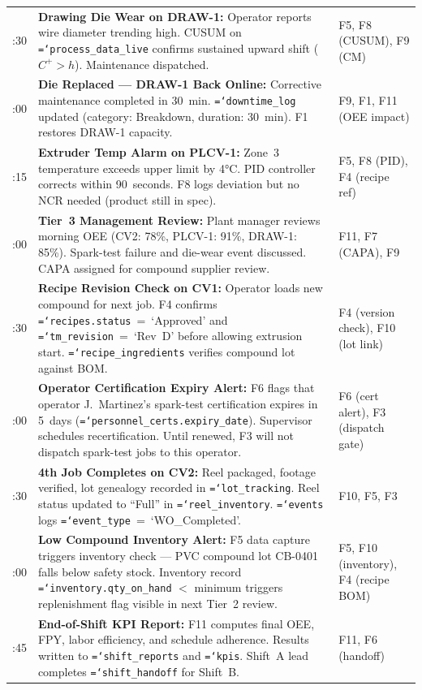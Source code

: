 \documentclass[11pt]{article}
\newcommand{\tfield}[1]{\texttt{\hyphenchar\font=`\-\relax #1}}
\begin{document}
\begin{longtable}{@{} l L{6.5cm} L{5.5cm} @{}}
:30 & \textbf{Drawing Die Wear on DRAW-1:} Operator reports wire diameter trending high.  CUSUM on \tfield{process\_data\_live} confirms sustained upward shift ($C^+ > h$).  Maintenance dispatched. & F5, F8 (CUSUM), F9 (CM) \\
:00 & \textbf{Die Replaced --- DRAW-1 Back Online:} Corrective maintenance completed in 30~min.  \tfield{downtime\_log} updated (category: Breakdown, duration: 30~min).  F1 restores DRAW-1 capacity. & F9, F1, F11 (OEE impact) \\
:15 & \textbf{Extruder Temp Alarm on PLCV-1:} Zone~3 temperature exceeds upper limit by 4°C.  PID controller corrects within 90~seconds.  F8 logs deviation but no NCR needed (product still in spec). & F5, F8 (PID), F4 (recipe ref) \\
:00 & \textbf{Tier~3 Management Review:} Plant manager reviews morning OEE (CV2: 78\%, PLCV-1: 91\%, DRAW-1: 85\%).  Spark-test failure and die-wear event discussed.  CAPA assigned for compound supplier review. & F11, F7 (CAPA), F9 \\
:30 & \textbf{Recipe Revision Check on CV1:} Operator loads new compound for next job.  F4 confirms \tfield{recipes.status}~=~`Approved' and \tfield{tm\_revision}~=~`Rev~D' before allowing extrusion start.  \tfield{recipe\_ingredients} verifies compound lot against BOM. & F4 (version check), F10 (lot link) \\
:00 & \textbf{Operator Certification Expiry Alert:} F6 flags that operator J.~Martinez's spark-test certification expires in 5~days (\tfield{personnel\_certs.expiry\_date}).  Supervisor schedules recertification.  Until renewed, F3 will not dispatch spark-test jobs to this operator. & F6 (cert alert), F3 (dispatch gate) \\
:30 & \textbf{4th Job Completes on CV2:} Reel packaged, footage verified, lot genealogy recorded in \tfield{lot\_tracking}.  Reel status updated to ``Full'' in \tfield{reel\_inventory}.  \tfield{events} logs \tfield{event\_type}~=~`WO\_Completed'. & F10, F5, F3 \\
:00 & \textbf{Low Compound Inventory Alert:} F5 data capture triggers inventory check --- PVC compound lot CB-0401 falls below safety stock.  Inventory record \tfield{inventory.qty\_on\_hand} $<$ minimum triggers replenishment flag visible in next Tier~2 review. & F5, F10 (inventory), F4 (recipe BOM) \\
:45 & \textbf{End-of-Shift KPI Report:} F11 computes final OEE, FPY, labor efficiency, and schedule adherence.  Results written to \tfield{shift\_reports} and \tfield{kpis}.  Shift~A lead completes \tfield{shift\_handoff} for Shift~B. & F11, F6 (handoff) \\
\bottomrule
\end{longtable}
\end{document}
